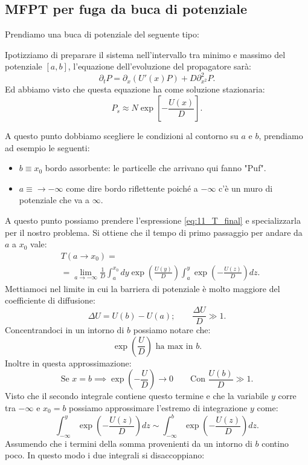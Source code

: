 \subsection{MFPT per fuga da buca di potenziale}%
\label{sub:MFPT per fuga da buca di potenziale}
Prendiamo una buca di potenziale del seguente tipo:

\noindent
Ipotizziamo di preparare il sistema nell'intervallo tra minimo e massimo del potenziale $[ a, b ]$, l'equazione dell'evoluzione del propagatore sarà:
\[
    \partial_{t}P = \partial_{x}\left(U'(x) P\right) + D\partial^2_{x^2}P
.\] 
Ed abbiamo visto che questa equazione ha come soluzione stazionaria:
\[
    P_s \approx N\exp\left[-\frac{U(x)}{D}\right]
.\] 

\noindent
A questo punto dobbiamo scegliere le condizioni al contorno su $a$ e $b$, prendiamo ad esempio le seguenti:
\begin{itemize}
    \item $b\equiv x_0$ bordo assorbente: le particelle che arrivano qui fanno "Puf".
    \item $a\equiv \to -\infty$ come dire bordo riflettente poiché a $-\infty$ c'è un muro di potenziale che va a $\infty$.
\end{itemize}
A questo punto possiamo prendere l'espressione \ref{eq:11_T_final} e specializzarla per il nostro problema. Si ottiene che il tempo di primo passaggio per andare da $a$ a $x_0$ vale:
\[\begin{aligned}
    &T(a\to x_0) =\\
    & = \lim_{a \to -\infty} \frac{1}{D}\int_{a}^{x_0} dy \exp\left(\frac{U(y)}{D}\right) \int_{a}^{y} \exp\left(-\frac{U(z)}{D}\right)dz 
.\end{aligned}\]
Mettiamoci nel limite in cui la barriera di potenziale è molto maggiore del coefficiente di diffusione:
\[
    \Delta  U = U(b) -U(a); \qquad \frac{\Delta U}{D}\gg 1
.\] 
Concentrandoci in un intorno di $b$ possiamo notare che:
\[
    \exp\left(\frac{U}{D}\right) \text{ ha max in }b
.\] 
Inoltre in questa approssimazione:
\[
    \text{Se } x = b \implies  \exp\left(-\frac{U}{D}\right)\to 0 \qquad \text{Con } \frac{U(b)}{D} \gg 1
.\] 
Visto che il secondo integrale contiene questo termine e che la variabile $y$ corre tra $-\infty$ e $x_0=b$ possiamo approssimare l'estremo di integrazione $y$ come:
\[
 \int_{-\infty}^{y} \exp\left(-\frac{U(z)}{D}\right)dz \sim \int_{-\infty}^{b} \exp\left(-\frac{U(z)}{D}\right)dz   
.\] 
Assumendo che i termini della somma provenienti da un intorno di $b$ contino poco. In questo modo i due integrali si disaccoppiano:
